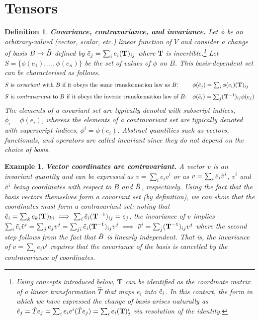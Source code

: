 \documentclass[11pt,fleqn]{article}
\newcommand{\f}{\phi}        %
\newcommand{\tl}{\ensuremath{\tilde}}
\newcommand{\op}[1]{\ensuremath{\hat{#1}}}
\newcommand{\ld}{\ensuremath{\ldots}}
\newcommand{\bmit}[1]{{\bfseries\itshape\mathversion{bold}#1}}
\newcommand{\bo}[1]{\ensuremath{\mathbf{#1}}}
\newcommand{\ts}{\textstyle}
\theoremstyle{mystyle}
\newtheorem{dfn}{Definition}
\newtheorem{ex}{Example}
\numberwithin{equation}{section}
\begin{document}
\newpage
\section*{Tensors}

\begin{dfn}
\label{variances}
\bmit{Covariance, contravariance, and invariance.}
Let $\f$ be an arbitrary-valued (vector, scalar, etc.) linear function of $V$ and consider a change of basis $B\rightarrow\tl{B}$ defined by $\tl{e}_j=\sum_ie_i(\bo{T})_{ij}$ where $\bo{T}$ is invertible.\footnote{Using concepts introduced below, $\bo{T}$ can be identified as the coordinate matrix of a linear transformation $\op{T}$ that maps $e_i$ into $\tl{e}_i$.
In this context, the form in which we have expressed the change of basis arises naturally as $\tl{e}_j=\op{T}e_j=\sum_ie_ie^i(\op{T}e_j)=\sum_ie_i(\bo{T})^i_j$ via resolution of the identity.}
Let $S=\{\f(e_1),\ld,\f(e_n)\}$ be the set of values of $\f$ on $B$.
This basis-dependent set can be characterised as follows.
\begin{align*}
&
  \text{$S$ is \textit{covariant} with $B$ if it obeys the same transformation law as $B$:}
&&\ts
  \f(\tl{e}_j)
=
  \sum_i
  \f(e_i)
  (\bo{T})_{ij}
\\[5pt]
&
  \text{$S$ is \textit{contravariant} to $B$ if it obeys the inverse transformation law of $B$:}
&&\ts
  \f(\tl{e}_i)
=
  \sum_j
  (\bo{T}^{-1})_{ij}
  \f(e_j)
\end{align*}
The elements of a \textit{covariant} set are typically denoted with subscript indices, $\f_i=\f(e_i)$, whereas the elements of a \textit{contravariant} set are typically denoted with superscript indices, $\f^i=\f(e_i)$.
Abstract quantities such as vectors, functionals, and operators are called \textit{invariant} since they do not depend on the choice of basis.
\end{dfn}

\begin{ex}
\label{contravariance-of-coordinates}
\bmit{Vector coordinates are contravariant.}
A vector $v$ is an \textit{invariant} quantity and can be expressed as $v=\sum_ie_iv^i$ or as $v=\sum_i\tl{e}_i\tl{v}^i$, $v^i$ and $\tl{v}^i$ being coordinates with respect to $B$ and $\tl{B}$, respectively.
Using the fact that the basis vectors themselves form a \textit{covariant} set (by definition), we can show that the coordinates must form a \textit{contravariant} set:
noting that
$
  \tl{e}_i
=
  \sum_k e_k(\bo{T})_{ki}
\implies
  \sum_i
  \tl{e}_i(\bo{T}^{-1})_{ij}
=
  e_j
$, the invariance of $v$ implies
$
  \sum_i\tl{e}_i\tl{v}^i
=
  \sum_je_jv^j
=
  \sum_{ji}
  \tl{e}_i(\bo{T}^{-1})_{ij}v^j
\implies
  \tl{v}^i
=
  \sum_j
  (\bo{T}^{-1})_{ij}v^j
$
where the second step follows from the fact that $\tl{B}$ is linearly independent.
That is, the \textit{invariance} of $v=\sum_ie_iv^i$ requires that the \textit{covariance} of the basis is cancelled by the \textit{contravariance} of coordinates.
\end{ex}
\end{document}
